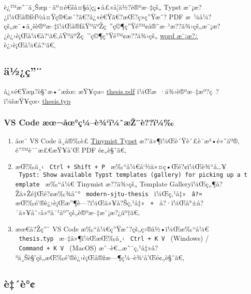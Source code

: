 \label{readme}
è¿™æ˜¯ä¸Šæµ·äº¤é€šå¤§å­¦ç¡•å£«å­¦ä½?è®ºæ--‡çš„ Typst
æ¨¡æ?¿ï¼Œå®ƒèƒ½å¤Ÿç®€æ´?ã€?å¿«é€Ÿã€?æŒ?ç»­ç''Ÿæˆ? PDF
æ~¼å¼?çš„æ¯•ä¸šè®ºæ--‡ï¼Œå®ƒåŸºäºŽç~''ç©¶ç''Ÿé™¢å®˜æ--¹æ??ä¾›çš„æ¨¡æ?¿è¿›è¡Œå¼€å?{}`ã€‚åŸºäºŽç~''ç©¶ç''Ÿé™¢æ??ä¾›çš„
\href{https://www.gs.sjtu.edu.cn/post/detail/Z3M2MjU=}{word æ¨¡æ?¿}
è¿›è¡Œå¼€å?{}`ã€‚

\subsection{ä½¿ç''¨}\label{uxe4uxbduxe7}

å¿«é€Ÿæµ?è§ˆæ•ˆæžœ: æŸ¥çœ‹
\href{https://github.com/tzhTaylor/typst-sjtu-thesis-master/releases/download/v0.1.0/thesis.pdf}{thesis.pdf}
ï¼Œæ~·ä¾‹è®ºæ--‡æº?ç~?ï¼šæŸ¥çœ‹
\href{https://github.com/tzhTaylor/typst-sjtu-thesis-master/blob/main/template/thesis.typ}{thesis.typ}

\subsubsection{VS Code
æœ¬åœ°ç¼--è¾`ï¼ˆæŽ¨è??ï¼‰}\label{vs-code-uxe6ux153uxe5ux153uxe7uxbcuxe8uxbeuxefuxbcux2c6uxe6ux17euxe8uxefuxbc}

\begin{enumerate}
\item
  åœ¨ VS Code ä¸­å®‰è£
  \href{https://marketplace.visualstudio.com/items?itemName=myriad-dreamin.tinymist}{Tinymist
  Typst} æ?'ä»¶ï¼Œè´Ÿè´£è¯­æ³•é«˜äº®, é''™è¯¯æ£€æŸ¥å'Œ PDF é¢„è§ˆã€‚
\item
  æŒ‰ä¸‹ \texttt{\ Ctrl\ +\ Shift\ +\ P\ }
  æ‰``å¼€å`½ä»¤ç•Œé?¢ï¼Œè¾``å\ldots¥
  \texttt{\ Typst:\ Show\ available\ Typst\ templates\ (gallery)\ for\ picking\ up\ a\ template\ }
  æ‰``å¼€ Tinymist æ??ä¾›çš„ Template Galleryï¼Œç„¶å?Žä»Žé‡Œé?¢æ‰¾åˆ°
  \texttt{\ modern-sjtu-thesis\ } ï¼Œç‚¹å‡» \texttt{\ â?¤\ }
  æŒ‰é'®è¿›è¡Œæ''¶è---?ï¼Œä»¥å?Šç‚¹å‡» \texttt{\ +\ }
  å?·ï¼Œå°±å?¯ä»¥åˆ›å»ºå¯¹åº''çš„è®ºæ--‡æ¨¡æ?¿äº†ã€‚
\item
  æœ€å?Žç''¨ VS Code æ‰``å¼€ç''Ÿæˆ?çš„ç›®å½•ï¼Œæ‰``å¼€
  \texttt{\ thesis.typ\ } æ--‡ä»¶ï¼ŒæŒ‰ä¸‹ \texttt{\ Ctrl\ +\ K\ V\ }
  (Windows) / \texttt{\ Command\ +\ K\ V\ } (MacOS)
  æˆ--è€\ldots æ˜¯ç‚¹å‡»å?³ä¸Šè§'çš„æŒ‰é'®è¿›è¡Œå®žæ---¶ç¼--è¾`å'Œé¢„è§ˆã€‚
\end{enumerate}

\subsection{è‡´è°¢}\label{uxe8uxe8}

